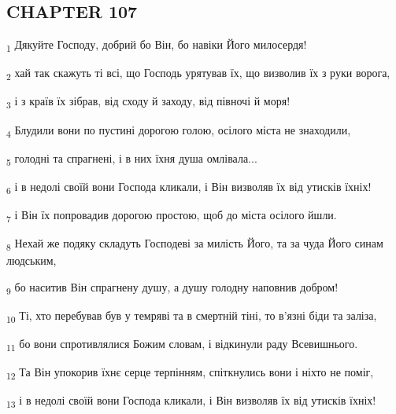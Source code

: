 \subsection{CHAPTER 107}
\begin{tcolorbox}
\textsubscript{1} Дякуйте Господу, добрий бо Він, бо навіки Його милосердя!
\end{tcolorbox}
\begin{tcolorbox}
\textsubscript{2} хай так скажуть ті всі, що Господь урятував їх, що визволив їх з руки ворога,
\end{tcolorbox}
\begin{tcolorbox}
\textsubscript{3} і з країв їх зібрав, від сходу й заходу, від півночі й моря!
\end{tcolorbox}
\begin{tcolorbox}
\textsubscript{4} Блудили вони по пустині дорогою голою, осілого міста не знаходили,
\end{tcolorbox}
\begin{tcolorbox}
\textsubscript{5} голодні та спрагнені, і в них їхня душа омлівала...
\end{tcolorbox}
\begin{tcolorbox}
\textsubscript{6} і в недолі своїй вони Господа кликали, і Він визволяв їх від утисків їхніх!
\end{tcolorbox}
\begin{tcolorbox}
\textsubscript{7} і Він їх попровадив дорогою простою, щоб до міста осілого йшли.
\end{tcolorbox}
\begin{tcolorbox}
\textsubscript{8} Нехай же подяку складуть Господеві за милість Його, та за чуда Його синам людським,
\end{tcolorbox}
\begin{tcolorbox}
\textsubscript{9} бо наситив Він спрагнену душу, а душу голодну наповнив добром!
\end{tcolorbox}
\begin{tcolorbox}
\textsubscript{10} Ті, хто перебував був у темряві та в смертній тіні, то в'язні біди та заліза,
\end{tcolorbox}
\begin{tcolorbox}
\textsubscript{11} бо вони спротивлялися Божим словам, і відкинули раду Всевишнього.
\end{tcolorbox}
\begin{tcolorbox}
\textsubscript{12} Та Він упокорив їхнє серце терпінням, спіткнулись вони і ніхто не поміг,
\end{tcolorbox}
\begin{tcolorbox}
\textsubscript{13} і в недолі своїй вони Господа кликали, і Він визволяв їх від утисків їхніх!
\end{tcolorbox}
